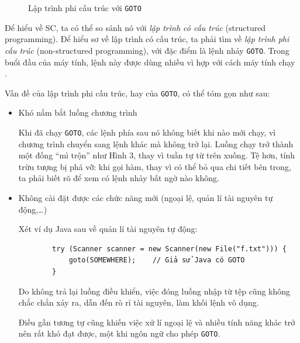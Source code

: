 \documentclass[../../thesis]{subfiles}
\begin{document}
\begin{figure}
    \centering
    \vspace*{-6mm}
    
    \vspace*{-10mm}    %
    \caption{Lập trình phi cấu trúc với \texttt{GOTO} \cite{NJS_SC}}
    \label{fig:non-structured-programming}
\end{figure}

Để hiểu về SC, ta có thể so sánh nó với \emph{lập trình có cấu trúc} (structured
programming). Để hiểu sơ về lập trình có cấu trúc, ta phải tìm về \emph{lập
trình phi cấu trúc} (non-structured programming), với đặc điểm là lệnh nhảy
\texttt{GOTO}. Trong buổi đầu của máy tính, lệnh này được dùng nhiều vì hợp với
cách máy tính chạy \cite{NJS_SC}.

Vấn đề của lập trình phi cấu trúc, hay của \texttt{GOTO}, có thể tóm gọn như
sau:

\begin{itemize}
    \item
        Khó nắm bắt luồng chương trình

        Khi đã chạy \texttt{GOTO}, các lệnh phía sau nó không biết khi nào mới
        chạy, vì chương trình chuyển sang lệnh khác mà không trở lại. Luồng chạy
        trở thành một đống ``mì trộn'' như Hình 3, thay vì tuần tự từ trên
        xuống. Tệ hơn, tính trừu tượng bị phá vỡ: khi gọi hàm, thay vì có thể bỏ
        qua chi tiết bên trong, ta phải biết rõ để xem có lệnh nhảy bất ngờ nào
        không.
\end{itemize}

%     

\begin{itemize}[resume, before = \vspace*{-\dimexpr\topsep+\partopsep\relax}]
    \item
        Không cài đặt được các chức năng mới (ngoại lệ, quản lí tài nguyên tự
        động,\ldots)

        Xét ví dụ Java sau về quản lí tài nguyên tự động:

        \begin{verbatim}
        try (Scanner scanner = new Scanner(new File("f.txt"))) {
            goto(SOMEWHERE);    // Giả sử Java có GOTO
        }
        \end{verbatim}

        Do không trả lại luồng điều khiển, việc đóng luồng nhập từ tệp cũng
        không chắc chắn xảy ra, dẫn đến rò rỉ tài nguyên, làm khối lệnh vô dụng.

        Điều gần tương tự cũng khiến việc xử lí ngoại lệ và nhiều tính năng khác
        trở nên rất khó đạt được, một khi ngôn ngữ cho phép \texttt{GOTO}.
\end{itemize}
\end{document}
